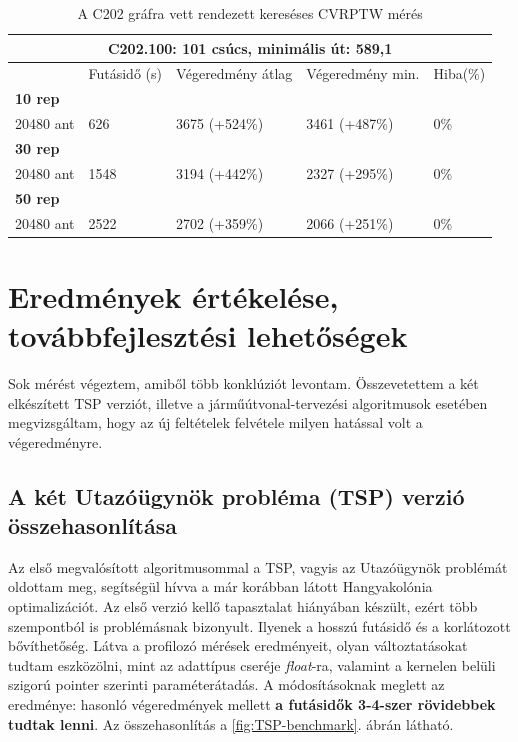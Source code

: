 \begin{table}[ht!]
	\centering
	\begin{tabular}{|p{1.75cm}||p{2cm}|p{3.25cm}|p{3.25cm}|p{1.5cm}|}
		\hline
		\multicolumn{5}{|c|}{C202.100: 101 csúcs, minimális út: 589,1} \\
		\hline
		& Futásidő (s) & Végeredmény átlag & Végeredmény min. & Hiba(\%) \\
		\hline
		\textbf{10 rep} &  &  &  & \\
		20480 ant & 626 & 3675 (+524\%) & 3461 (+487\%) &  0\% \\
		\hline
		\textbf{30 rep} &  &  &  & \\
		20480 ant & 1548 & 3194 (+442\%) & 2327 (+295\%) &  0\% \\
		\hline
		\textbf{50 rep} &  &  &  &  \\
		20480 ant & 2522 & 2702 (+359\%) & 2066 (+251\%) &  0\% \\
		\hline
	\end{tabular}
	\caption{A C202 gráfra vett rendezett kereséses CVRPTW mérés}
	\label{table:VRTPW2_100_3}
\end{table}

\chapter{Eredmények értékelése, továbbfejlesztési lehetőségek} \label{results_section}
Sok mérést végeztem, amiből több konklúziót levontam. Összevetettem a két elkészített TSP verziót, illetve a járműútvonal-tervezési algoritmusok esetében megvizsgáltam, hogy az új feltételek felvétele milyen hatással volt a végeredményre.

\section{A két Utazóügynök probléma (TSP) verzió összehasonlítása}

Az első megvalósított algoritmusommal a TSP, vagyis az Utazóügynök problémát oldottam meg, segítségül hívva a már korábban látott Hangyakolónia optimalizációt. Az első verzió kellő tapasztalat hiányában készült, ezért több szempontból is problémásnak bizonyult. Ilyenek a hosszú futásidő és a korlátozott bővíthetőség. Látva a profilozó mérések eredményeit, olyan változtatásokat tudtam eszközölni, mint az adattípus cseréje \textit{float}-ra, valamint a kernelen belüli szigorú pointer szerinti paraméterátadás. A módosításoknak meglett az eredménye: hasonló végeredmények mellett \textbf{a futásidők 3-4-szer rövidebbek tudtak lenni}. Az összehasonlítás a \ref{fig:TSP-benchmark}. ábrán látható.

